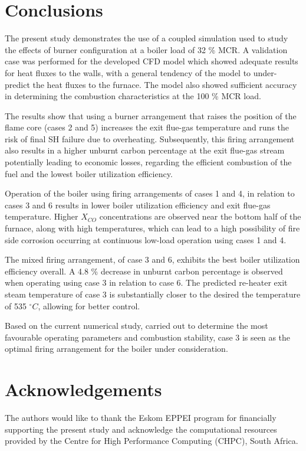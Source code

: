 \documentclass[review]{elsarticle}
\begin{document}
\clearpage
\section{Conclusions}
The present study demonstrates the use of a coupled simulation used to study the effects of burner configuration at a boiler load of 32 \% MCR. A validation case was performed for the developed CFD model which showed adequate results for heat fluxes to the walls, with a general tendency of the model to under-predict the heat fluxes to the furnace. The model also showed sufficient accuracy in determining the combustion characteristics at the 100 \% MCR load. 

The results show that using a burner arrangement that raises the position of the flame core (cases 2 and 5) increases the exit flue-gas temperature and runs the risk of final SH failure due to overheating. Subsequently, this firing arrangement also results in a higher unburnt carbon percentage at the exit flue-gas stream potentially leading to economic losses, regarding the efficient combustion of the fuel and the lowest boiler utilization efficiency.

Operation of the boiler using firing arrangements of cases 1 and 4, in relation to cases 3 and 6 results in lower boiler utilization efficiency and exit flue-gas temperature. Higher $X_{CO}$ concentrations are observed near the bottom half of the furnace, along with high temperatures, which can lead to a high possibility of fire side corrosion occurring at continuous low-load operation using cases 1 and 4.

The mixed firing arrangement, of case 3 and 6, exhibits the best boiler utilization efficiency overall. A 4.8 \% decrease in unburnt carbon percentage is observed when operating using case 3 in relation to case 6. The predicted re-heater exit steam temperature of case 3 is substantially closer to the desired the temperature of 535 $^\circ C$, allowing for better control. 

Based on the current numerical study, carried out to determine the most favourable operating parameters and combustion stability, case 3 is seen as the optimal firing arrangement for the boiler under consideration.

\section*{Acknowledgements}
The authors would like to thank the Eskom EPPEI program for financially supporting the present study and acknowledge the computational resources provided by the Centre for High Performance Computing (CHPC), South Africa.


\end{document}
